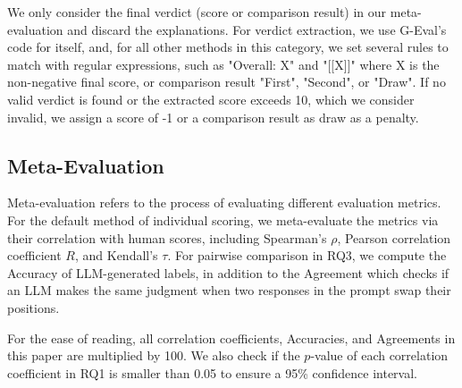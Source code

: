 We only consider the final verdict (score or comparison result) in our meta-evaluation and discard the explanations. For verdict extraction, we use G-Eval's code for itself, and, for all other methods in this category, we set several rules to match with regular expressions, such as "Overall: X" and "[[X]]" where X is the non-negative final score, or comparison result "First", "Second", or "Draw". If no valid verdict is found or the extracted score exceeds 10, which we consider invalid, we assign a score of -1 or a comparison result as draw as a penalty.

\subsection{Meta-Evaluation}
Meta-evaluation refers to the process of evaluating different evaluation metrics. For the default method of individual scoring, we meta-evaluate the metrics via their correlation with human scores, including Spearman's \(\rho\), Pearson correlation coefficient \(R\), and Kendall's \(\tau\). For pairwise comparison in RQ3, we compute the Accuracy of LLM-generated labels, in addition to the Agreement which checks if an LLM makes the same judgment when two responses in the prompt swap their positions.

For the ease of reading, all correlation coefficients, Accuracies, and Agreements in this paper are multiplied by 100. We also check if the \(p\)-value of each correlation coefficient in RQ1 is smaller than 0.05 to ensure a 95\% confidence interval.
